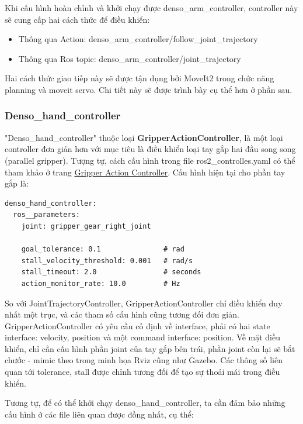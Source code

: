 Khi cấu hình hoàn chỉnh và khởi chạy được denso\_arm\_controller, controller này sẽ cung cấp hai cách thức để điều khiển: 

\begin{itemize}
    \item Thông qua Action: denso\_arm\_controller/follow\_joint\_trajectory
    \item Thông qua Ros topic: denso\_arm\_controller/joint\_trajectory
\end{itemize}

Hai cách thức giao tiếp này sẽ được tận dụng bởi MoveIt2 trong chức năng planning và moveit servo. Chi tiết này sẽ được trình bày cụ thể hơn ở phần sau.

\subsubsection{Denso\_hand\_controller}

"Denso\_hand\_controller" thuộc loại \textbf{GripperActionController}, là một loại controller đơn giản hơn với mục tiêu là điều khiển loại tay gắp hai đầu song song (parallel gripper). Tượng tự, cách cấu hình trong file ros2\_controlles.yaml có thể tham khảo ở trang \href{https://control.ros.org/humble/doc/ros2_controllers/gripper_controllers/doc/userdoc.html}{Gripper Action Controller}. Cấu hình hiện tại cho phần tay gắp là:

\begin{lstlisting}
denso_hand_controller:
  ros__parameters:
    joint: gripper_gear_right_joint

    goal_tolerance: 0.1               # rad
    stall_velocity_threshold: 0.001   # rad/s
    stall_timeout: 2.0                # seconds
    action_monitor_rate: 10.0         # Hz
\end{lstlisting}

So với JointTrajectoryController, GripperActionController chỉ điều khiển duy nhất một trục, và các tham số cấu hình cũng tương đối đơn giản. GripperActionController có yêu cầu cố định về interface, phải có hai state interface: velocity, position và một command interface: position. Về mặt điều khiển, chỉ cần cấu hình phần joint của tay gắp bên trái, phần joint còn lại sẽ bắt chước - mimic theo trong minh họa Rviz cũng như Gazebo. Các thông số liên quan tới tolerance, stall được chỉnh tương đối để tạo sự thoải mái trong điều khiển.

Tương tự, để có thể khởi chạy denso\_hand\_controller, ta cần đảm bảo những cấu hình ở các file liên quan được đồng nhất, cụ thể:

